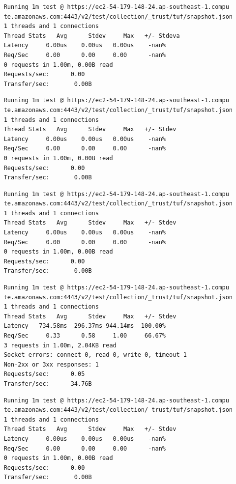 \documentclass[a4paper,12pt]{article}
\newcounter{subsubsubsection}[subsubsection]
\begin{document}
{{	
	\begin{verbatim}
	Running 1m test @ https://ec2-54-179-148-24.ap-southeast-1.compu
	te.amazonaws.com:4443/v2/test/collection/_trust/tuf/snapshot.json
	1 threads and 1 connections
	Thread Stats   Avg      Stdev     Max   +/- Stdeva
	Latency     0.00us    0.00us   0.00us    -nan%
	Req/Sec     0.00      0.00     0.00      -nan%
	0 requests in 1.00m, 0.00B read
	Requests/sec:      0.00
	Transfer/sec:       0.00B
	\end{verbatim}
	\begin{verbatim}
	Running 1m test @ https://ec2-54-179-148-24.ap-southeast-1.compu
	te.amazonaws.com:4443/v2/test/collection/_trust/tuf/snapshot.json
	1 threads and 1 connections
	Thread Stats   Avg      Stdev     Max   +/- Stdev
	Latency     0.00us    0.00us   0.00us    -nan%
	Req/Sec     0.00      0.00     0.00      -nan%
	0 requests in 1.00m, 0.00B read
	Requests/sec:      0.00
	Transfer/sec:       0.00B
	\end{verbatim}
	\begin{verbatim}
	Running 1m test @ https://ec2-54-179-148-24.ap-southeast-1.compu
	te.amazonaws.com:4443/v2/test/collection/_trust/tuf/snapshot.json
	1 threads and 1 connections
	Thread Stats   Avg      Stdev     Max   +/- Stdev
	Latency     0.00us    0.00us   0.00us    -nan%
	Req/Sec     0.00      0.00     0.00      -nan%
	0 requests in 1.00m, 0.00B read
	Requests/sec:      0.00
	Transfer/sec:       0.00B
	\end{verbatim}
	\begin{verbatim}
	Running 1m test @ https://ec2-54-179-148-24.ap-southeast-1.compu
	te.amazonaws.com:4443/v2/test/collection/_trust/tuf/snapshot.json
	1 threads and 1 connections
	Thread Stats   Avg      Stdev     Max   +/- Stdev
	Latency   734.58ms  296.37ms 944.14ms  100.00%
	Req/Sec     0.33      0.58     1.00     66.67%
	3 requests in 1.00m, 2.04KB read
	Socket errors: connect 0, read 0, write 0, timeout 1
	Non-2xx or 3xx responses: 1
	Requests/sec:      0.05
	Transfer/sec:      34.76B
	\end{verbatim}
	\newpage
	\begin{verbatim}
	Running 1m test @ https://ec2-54-179-148-24.ap-southeast-1.compu
	te.amazonaws.com:4443/v2/test/collection/_trust/tuf/snapshot.json
	1 threads and 1 connections
	Thread Stats   Avg      Stdev     Max   +/- Stdev
	Latency     0.00us    0.00us   0.00us    -nan%
	Req/Sec     0.00      0.00     0.00      -nan%
	0 requests in 1.00m, 0.00B read
	Requests/sec:      0.00
	Transfer/sec:       0.00B
	\end{verbatim}
	\newpage
}}
\end{document}
